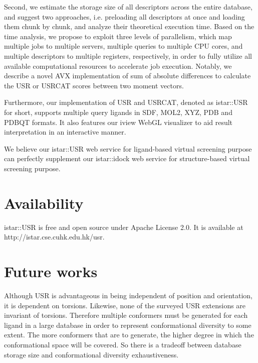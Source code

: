 Second, we estimate the storage size of all descriptors across the entire database, and suggest two approaches, i.e. preloading all descriptors at once and loading them chunk by chunk, and analyze their theoretical execution time. Based on the time analysis, we propose to exploit three levels of parallelism, which map multiple jobs to multiple servers, multiple queries to multiple CPU cores, and multiple descriptors to multiple registers, respectively, in order to fully utilize all available computational resources to accelerate job execution. Notably, we describe a novel AVX implementation of sum of absolute differences to calculate the USR or USRCAT scores between two moment vectors.

Furthermore, our implementation of USR and USRCAT, denoted as istar::USR for short, supports multiple query ligands in SDF, MOL2, XYZ, PDB and PDBQT formats. It also features our iview WebGL visualizer to aid result interpretation in an interactive manner.

We believe our istar::USR web service for ligand-based virtual screening purpose can perfectly supplement our istar::idock web service for structure-based virtual screening purpose.

\section{Availability}

istar::USR is free and open source under Apache License 2.0. It is available at http://istar.cse.cuhk.edu.hk/usr.

\section{Future works}

Although USR is advantageous in being independent of position and orientation, it is dependent on torsions. Likewise, none of the surveyed USR extensions are invariant of torsions. Therefore multiple conformers must be generated for each ligand in a large database in order to represent conformational diversity to some extent. The more conformers that are to generate, the higher degree in which the conformational space will be covered. So there is a tradeoff between database storage size and conformational diversity exhaustiveness.

